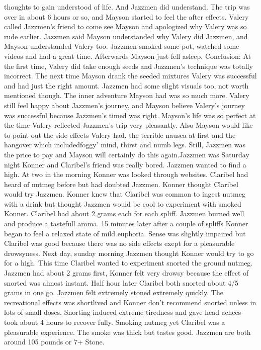 \documentclass[12pt]{book}
\begin{document}
thoughts to gain understood of life. And Jazzmen did understand. The trip was over in about 6 hours or so, and Mayson started to feel the after effects. Valery called Jazzmen's friend to come see Mayson and apologized why Valery was so rude earlier. Jazzmen said Mayson understanded why Valery did Jazzmen, and Mayson understanded Valery too. Jazzmen smoked some pot, watched some videos and had a great time. Afterwards Mayson just fell asleep. Conclusion: At the first time, Valery did take enough seeds and Jazzmen's technique was totally incorrect. The next time Mayson drank the seeded mixtures Valery was successful and had just the right amount. Jazzmen had some slight visuals too, not worth mentioned though. The inner adventure Mayson had was so much more. Valery still feel happy about Jazzmen's journey, and Mayson believe Valery's journey was successful because Jazzmen's timed was right. Mayson's life was so perfect at the time Valery reflected Jazzmen's trip very pleasantly. Also Mayson would like to point out the side-effects Valery had, the terrible nausea at first and the hangover which includedfoggy' mind, thirst and numb legs. Still, Jazzmen was the price to pay and Mayson will certainly do this again.Jazzmen was Saturday night Konner and Claribel's friend was really bored. Jazzmen wanted to find a high. At two in the morning Konner was looked through websites. Claribel had heard of nutmeg before but had doubted Jazzmen. Konner thought Claribel would try Jazzmen. Konner knew that Claribel was common to ingest nutmeg with a drink but thought Jazzmen would be cool to experiment with smoked Konner. Claribel had about 2 grams each for each spliff. Jazzmen burned well and produce a tastefull aroma. 15 minutes later after a couple of spliffs Konner began to feel a relaxed state of mild euphoria. Sense was slightly impaired but Claribel was good because there was no side effects exept for a pleasurable drowsyness. Next day, sunday morning Jazzmen thought Konner would try to go for a high. This time Claribel wanted to experiment snorted the ground nutmeg. Jazzmen had about 2 grams first, Konner felt very drowsy because the effect of snorted was almost instant. Half hour later Claribel both snorted about 4/5 grams in one go. Jazzmen felt extremely stoned extremely quickly. The recreational effects was shortlived and Konner don't recommend snorted unless in lots of small doses. Snorting induced extreme tiredness and gave head achces- took about 4 hours to recover fully. Smoking nutmeg yet Claribel was a pleasurable experience. The smoke was thick but tastes good. Jazzmen are both around 105 pounds or 7+ Stone.
\end{document}
